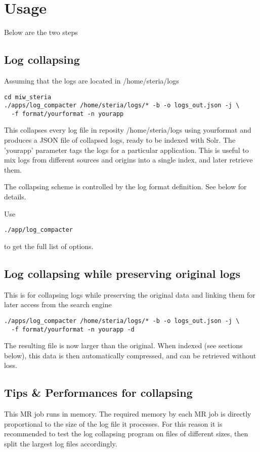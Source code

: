 \documentclass[twoside,11pt]{article}
\begin{document}
\section{Usage}

Below are the two steps 

\subsection{Log collapsing}
Assuming that the logs are located in /home/steria/logs 
\begin{verbatim}
cd miw_steria
./apps/log_compacter /home/steria/logs/* -b -o logs_out.json -j \
  -f format/yourformat -n yourapp
\end{verbatim}
This collapses every log file in reposity /home/steria/logs using yourformat and produces a JSON file of collapsed logs, ready to be indexed with Solr. The 'yourapp' parameter tags the logs for a particular application. This is useful to mix logs from different sources and origins into a single index, and later retrieve them.

The collapsing scheme is controlled by the log format definition. See below for details.

Use
\begin{verbatim}
./app/log_compacter
\end{verbatim}
to get the full list of options.

\subsection{Log collapsing while preserving original logs}\label{subsec:original}
This is for collapsing logs while preserving the original data and linking them for later access from the search engine
\begin{verbatim}
./apps/log_compacter /home/steria/logs/* -b -o logs_out.json -j \                                                                                            
  -f format/yourformat -n yourapp -d
\end{verbatim}

The resulting file is now larger than the original. When indexed (see sections below), this data is then automatically compressed, and can be retrieved without loss.

\subsection{Tips \& Performances for collapsing}
This MR job runs in memory. The required memory by each MR job is directly proportional to the size of the log file it processes. For this reason it is recommended to test the log collapsing program on files of different sizes, then split the largest log files accordingly.
\end{document}
